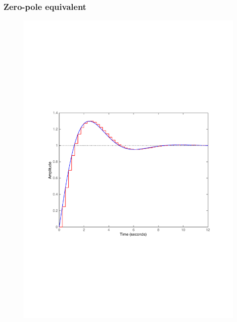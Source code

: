 \begin{frame}
	\frametitle{Zero-pole equivalent}
	\vspace{-0.7em}
	\begin{figure}
		\centering
		\includegraphics[width=0.85\linewidth]{vb4}
	\end{figure}
\end{frame}

